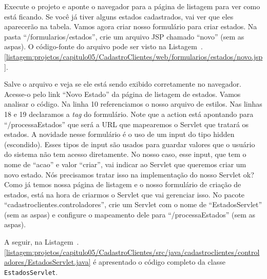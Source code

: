 
Execute o projeto e aponte o navegador para a página de listagem para ver como está ficando. Se você já tiver alguns estados cadastrados, vai ver que eles aparecerão na tabela. Vamos agora criar nosso formulário para criar estados. Na pasta ``/formularios/estados'', crie um arquivo JSP chamado ``novo'' (sem as aspas). O código-fonte do arquivo pode ser visto na Listagem~\thechapter.\ref{listagem:projetos/capitulo05/CadastroClientes/web/formularios/estados/novo.jsp}.


Salve o arquivo e veja se ele está sendo exibido corretamente no navegador. Acesse-o pelo link ``Novo Estado'' da página de listagem de estados. Vamos analisar o código. Na linha 10 referenciamos o nosso arquivo de estilos. Nas linhas 18 e 19 declaramos a \textit{tag} do formulário. Note que a action está apontando para ``/processaEstados'' que será a URL que mapearemos o Servlet que tratará os estados. A novidade nesse formulário é o uso de um input do tipo hidden (escondido). Esses tipos de input são usados para guardar valores que o usuário do sistema não tem acesso diretamente. No nosso caso, esse input, que tem o nome de ``acao'' e valor ``criar'', vai indicar ao Servlet que queremos criar um novo estado. Nós precisamos tratar isso na implementação do nosso Servlet ok? Como já temos nossa página de listagem e o nosso formulário de criação de estados, está na hora de criarmos o Servlet que vai gerenciar isso. No pacote ``cadastroclientes.controladores'', crie um Servlet com o nome de ``EstadosServlet'' (sem as aspas) e configure o mapeamento dele para ``/processaEstados'' (sem as aspas).

A seguir, na Listagem~\thechapter.\ref{listagem:projetos/capitulo05/CadastroClientes/src/java/cadastroclientes/controladores/EstadosServlet.java} é apresentado o código completo da classe \texttt{EstadosServlet}.


